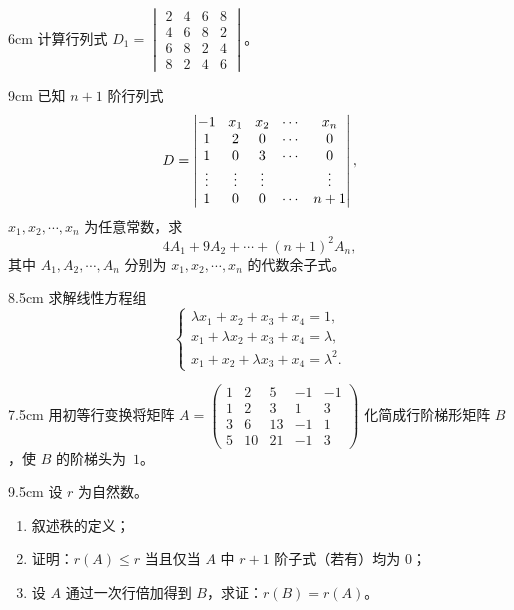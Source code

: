 
\begin{problem}{}{6cm}
计算行列式
$D_1=\begin{vmatrix}2&4&6&8\\4&6&8&2\\6&8&2&4\\8&2&4&6\end{vmatrix}$。
\end{problem}

\begin{problem}{}{9cm}
已知 $n+1$ 阶行列式
\[
\setlength{\arraycolsep}{4.5pt}
D=\begin{vmatrix}
-1&x_1&x_2&\cdots&x_n\\
1&2&0&\cdots&0\\
1&0&3&\cdots&0\\
\vdots&\vdots&\vdots&&\vdots\\
1&0&0&\cdots&n+1
\end{vmatrix},
\]
$x_1,x_2,\cdots,x_n$ 为任意常数，求
\[
4A_1+9A_2+\cdots+(n+1)^{2}A_n,
\]
其中 $A_1,A_2,\cdots,A_n$ 分别为 $x_1,x_2,\cdots,x_n$ 的代数余子式。
\end{problem}

\begin{problem}{}{8.5cm}
求解线性方程组
\[
\begin{cases}
\lambda x_1+x_2+x_3+x_4=1,\\
x_1+\lambda x_2+x_3+x_4=\lambda,\\
x_1+x_2+\lambda x_3+x_4=\lambda^{2}.
\end{cases}
\]
\end{problem}

\begin{problem}{}{7.5cm}
用初等行变换将矩阵
$A=\begin{pmatrix}1&2&5&-1&-1\\1&2&3&1&3\\3&6&13&-1&1\\5&10&21&-1&3\end{pmatrix}$
化简成行阶梯形矩阵 $B$，使 $B$ 的阶梯头为\mbox{~$1$}。
\end{problem}

\begin{problem}{}{9.5cm}
设 $r$ 为自然数。
\begin{enumerate}[label=(\arabic*),leftmargin=2.2em,itemsep=0.25em,topsep=0.3em]
  \item 叙述秩的定义；
  \item 证明：$r(A)\le r$ 当且仅当 $A$ 中 $r+1$ 阶子式（若有）均为 $0$；
  \item 设 $A$ 通过一次行倍加得到 $B$，求证：$r(B)=r(A)$。
\end{enumerate}
\end{problem}

